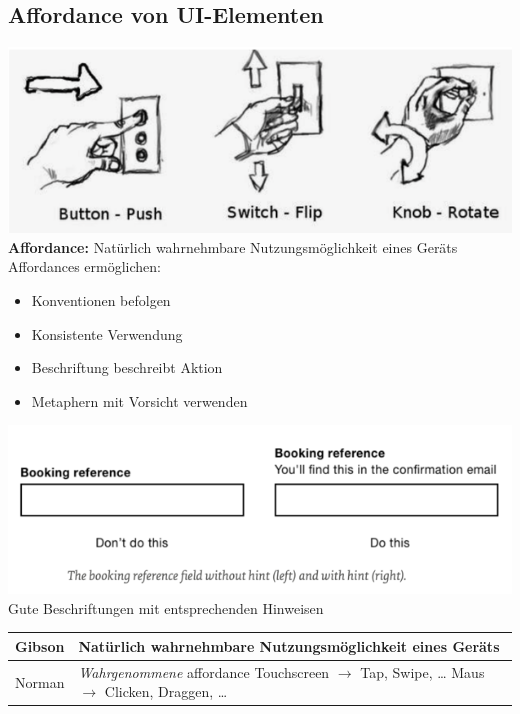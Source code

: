 \documentclass[a4paper, landscape, 8pt]{scrartcl}
\begin{document}
\begin{multicols*}{4}
        \subsection{Affordance von UI-Elementen}
        \includegraphics[scale=0.23]{graphic/09-push-flip-rotate}
        \\
        \textbf{Affordance:} Natürlich wahrnehmbare Nutzungsmöglichkeit eines Geräts \\

        Affordances ermöglichen:
        \begin{itemize}
            \item Konventionen befolgen
            \item Konsistente Verwendung
            \item Beschriftung beschreibt Aktion
            \item Metaphern mit Vorsicht verwenden
        \end{itemize}

        \includegraphics[scale=0.2]{graphic/13-affordance-booking-reference} \\
        Gute Beschriftungen mit entsprechenden Hinweisen

        \begin{tabularx}{\columnwidth}{l | X}
            \textcolor{subsectioncolor}{Gibson} &
            Natürlich wahrnehmbare Nutzungsmöglichkeit eines Geräts \\

            \hline
            \textcolor{subsectioncolor}{Norman} &
            \makecell[l]{
                \textit{Wahrgenommene} affordance \\
                Touchscreen $\to$ Tap, Swipe, \ldots \\
                Maus $\to$ Clicken, Draggen, \ldots
            }
        \end{tabularx}


\end{multicols*}
\end{document}
